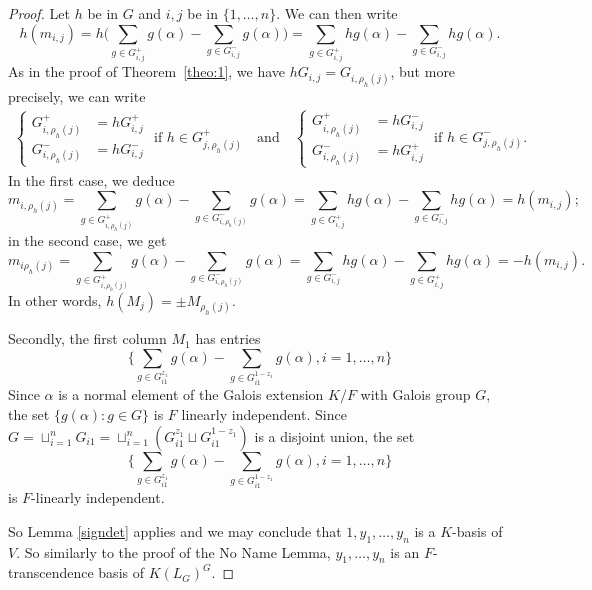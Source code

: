 \documentclass[12pt]{article}
\theoremstyle{plain}
\begin{document}
\begin{proof}
Let $h$ be in $G$
and  $i,j$ be in $\lbrace 1, \ldots, n \rbrace$. We 
can then write
$$h(m_{i,j}) = h\Big( \sum_{g\in G^{+}_{i,j}}g(\alpha) -\sum_{g\in
  G^{-}_{i,j}}g(\alpha)\Big) = \sum_{g\in G^{+}_{i,j}}hg(\alpha)
-\sum_{g\in G^{-}_{i,j}}hg(\alpha).$$ 
As in the proof of Theorem~\ref{theo:1}, we have
$hG_{i,j} = G_{i,\rho_h(j)}$, but more precisely, we can write
\begin{align}
\left \{
\begin{array}{ll}
  G^{+}_{i,\rho_{h}(j)}&= hG^{+}_{i,j}\\
G^{-}_{i,\rho_h(j)}&= hG^{-}_{i,j}
\end{array}\right .
\text{~if~} h \in G^+_{j,\rho_h(j)}
\quad\text{and}\quad
\left \{
\begin{array}{cl}
  G^{+}_{i,\rho_{h}(j)}&= hG^{-}_{i,j}\\
G^{-}_{i,\rho_h(j)}&= hG^{+}_{i,j}
\end{array}\right .
\text{~if~} h \in G^-_{j,\rho_h(j)}.
\end{align}
In the first case, we deduce
$$m_{i,\rho_h(j)} =  \sum_{g\in G^{+}_{i,\rho_h(j)}}g(\alpha) -\sum_{g\in G^{-}_{i,\rho_h(j)}}g(\alpha) 
                  =  \sum_{g\in G^{+}_{i,j}}hg(\alpha) -\sum_{g\in G^{-}_{i,j}}hg(\alpha)
=h(m_{i,j});$$
in the second case, we get
$$m_{i\rho_h(j)} =  \sum_{g\in G^{+}_{i,\rho_h(j)}}g(\alpha) -\sum_{g\in G^{-}_{i,\rho_h(j)}}g(\alpha) = \sum_{g\in G^{-}_{i,j}}hg(\alpha) -\sum_{g\in G^{+}_{i,j}}hg(\alpha)=-h(m_{i,j}).$$
In other words, $h(M_j) = \pm M_{\rho_h(j)}$.

Secondly, the first column $M_1$ has entries 
$$\lbrace\sum_{g \in G^{z_1}_{i1}}g(\alpha)- \sum_{g \in G^{1- z_1}_{i1}}g(\alpha), i = 1, \ldots,n\rbrace$$
Since $\alpha$ is a normal element of the Galois extension $K/F$ with Galois group $G$, the set $\lbrace g(\alpha): g \in G \rbrace$ is $F$ linearly independent. Since $G = \sqcup^n_{i =1}G_{i1}= \sqcup^n_{i =1}(G^{z_1}_{i1} \sqcup G^{1-z_1}_{i1}) $ is a disjoint union, the set 
$$\lbrace\sum_{g \in G^{z_1}_{i1}}g(\alpha)- \sum_{g \in G^{1- z_1}_{i1}}g(\alpha), i = 1, \ldots,n\rbrace$$
is $F$-linearly independent.

So Lemma \ref{signdet} applies and we may conclude that $1, y_1, \ldots, y_n$ is a $K$-basis of $V$. So similarly to the proof of the No Name Lemma, $y_1, \ldots, y_n$ is an $F$-transcendence basis of $K(L_G)^G$.
\end{proof}
\end{document}
